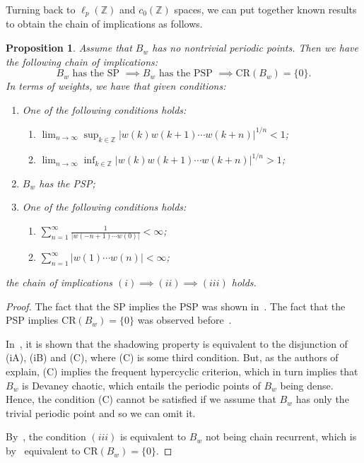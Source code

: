 \documentclass[11pt,a4paper]{amsart}
\newtheorem{proposition}[theorem]{Proposition}
\theoremstyle{definition}
\newcommand{\Z}{\mathbb{Z}}
\newcommand{\abs}[1]{\left| #1 \right|}
\newcommand{\CR}{\mathrm{CR}}
\begin{document}
	Turning back to $\ell_p(\Z)$ and $c_0(\Z)$ spaces, we can put together known results to obtain the chain of implications as follows.
	\begin{proposition} \label{prop:PSPsandwich}
		Assume that $B_w$ has no nontrivial periodic points. Then we have the following chain of implications:
		\begin{equation*}
			B_w \text{ has the SP }
			\implies
			B_w \text{ has the PSP }
			\implies
			\CR(B_w) = \{0\}.
		\end{equation*}
		In terms of weights, we have that given conditions:
		\begin{enumerate}
			\item One of the following conditions holds:
			\begin{enumerate}[label=(i\Alph*)]
				\item $\lim_{n \to \infty} \sup_{k \in \Z} \abs{w(k)w(k+1)\cdots w(k+n)}^{1/n} < 1$;
				\item $\lim_{n \to \infty} \inf_{k \in \Z} \abs{w(k)w(k+1)\cdots w(k+n)}^{1/n} > 1$;
			\end{enumerate}
			\item $B_w$ has the PSP;
			\item One of the following conditions holds:
			\begin{enumerate}[label=(iii\Alph*)]
				\item $\sum_{n=1}^\infty \frac{1}{\abs{w(-n+1) \cdots w(0)}} < \infty$;
				\item $\sum_{n=1}^\infty \abs{w(1) \cdots w(n)} < \infty$;
			\end{enumerate}
		\end{enumerate}
		the chain of implications $(i) \implies (ii) \implies (iii)$ holds.
	\end{proposition}
	\begin{proof}
		The fact that the SP implies the PSP was shown in~\cite{Shadowing_and_chain_rec}. The fact that the PSP implies $\CR(B_w) = \{0\}$ was observed before~.
		
		In~\cite[Theorem~18]{Shadowing_structural_stability}, it is shown that the shadowing property is equivalent to the disjunction of (iA), (iB) and (C), where (C) is some third condition. But, as the authors of~\cite{Shadowing_structural_stability} explain, (C) implies the frequent hypercyclic criterion, which in turn implies that $B_w$ is Devaney chaotic, which entails the periodic points of $B_w$ being dense. Hence, the condition (C) cannot be satisfied if we assume that $B_w$ has only the trivial periodic point and so we can omit it.
		
		By~\cite[Theorem~14]{Shadowing_and_chain_rec}, the condition $(iii)$ is equivalent to $B_w$ not being chain recurrent, which is by~ equivalent to $\CR(B_w) = \{0\}$.
	\end{proof}
	
\end{document}

